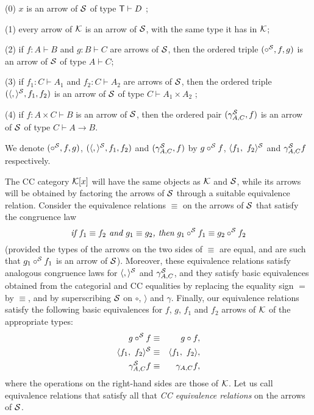 \noindent (0) $x$ is an arrow of ${\cal S}$ of type ${\sf T}\vdash D$%
;\smallskip

\noindent (1) every arrow of ${\cal K}$ is an arrow of ${\cal S}$, with the
same type it has in ${\cal K}$;\smallskip

\noindent (2) if $f:A\vdash B$ and $g:B\vdash C$ are arrows of ${\cal S}$,
then the ordered triple $(\circ ^{{\cal S}},f,g)$ is an arrow of ${\cal S}$
of type $A\vdash C$;\smallskip

\noindent (3) if $f_{1}:C\vdash A_{1}$ and $f_{2}:C\vdash A_{2}$ are arrows
of ${\cal S}$, then the ordered triple $(\langle ,\rangle ^{{\cal S}%
},f_{1},f_{2})$ is an arrow of ${\cal S}$ of type $C\vdash A_{1}\times A_{2}$%
;\smallskip

\noindent (4) if $f:A\times C\vdash B$ is an arrow of ${\cal S}$, then the
ordered pair $(\gamma _{A,C}^{{\cal S}},f)$ is an arrow of ${\cal S}$ of
type $C\vdash A\rightarrow B$.\medskip

\noindent We denote $(\circ ^{{\cal S}},f,g)$, $(\langle ,\rangle ^{{\cal S}%
},f_{1},f_{2})$ and $(\gamma _{A,C}^{{\cal S}},f)$ by $g\circ ^{{\cal S}}f$, 
$\langle f_{1},~f_{2}\rangle ^{{\cal S}}$ and $\gamma _{A,C}^{{\cal S}}f$
respectively.

The CC category ${\cal K}[x]$ will have the same objects as ${\cal K}$ and $%
{\cal S}$, while its arrows will be obtained by factoring the arrows of $%
{\cal S}$ through a suitable equivalence relation. Consider the equivalence
relations $\equiv $ on the arrows of ${\cal S}$ that satisfy the congruence
law 
\[
\text{{\it if} }f_{1}\equiv f_{2}\text{{\it \ and }}g_{1}\equiv g_{2}\text{%
{\it , then} }g_{1}\circ ^{{\cal S}}f_{1}\equiv g_{2}\circ ^{{\cal S}}f_{2} 
\]
(provided the types of the arrows on the two sides of $\equiv $ are equal,
and are such that $g_{1}\circ ^{{\cal S}}f_{1}$ is an arrow of ${\cal S}$).
Moreover, these equivalence relations satisfy analogous congruence laws for $%
\langle ,\rangle ^{{\cal S}}$ and $\gamma _{A,C}^{{\cal S}}$, and they
satisfy basic equivalences obtained from the categorial and CC equalities by
replacing the equality sign $=$ by $\equiv $, and by superscribing ${\cal S}$
on $\circ $, $\rangle $ and $\gamma $. Finally, our equivalence relations
satisfy the following basic equivalences for $f$, $g$, $f_{1}$ and $f_{2}$
arrows of ${\cal K}$ of the appropriate types: 
\begin{eqnarray*}
g\circ ^{{\cal S}}f &\equiv &g\circ f, \\
\langle f_{1},~f_{2}\rangle ^{{\cal S}} &\equiv &\langle f_{1},~f_{2}\rangle
, \\
\gamma _{A,C}^{{\cal S}}f &\equiv &\gamma _{A,C}f,
\end{eqnarray*}
where the operations on the right-hand sides are those of ${\cal K}$. Let us
call equivalence relations that satisfy all that {\it CC equivalence
relations} on the arrows of ${\cal S}$.

